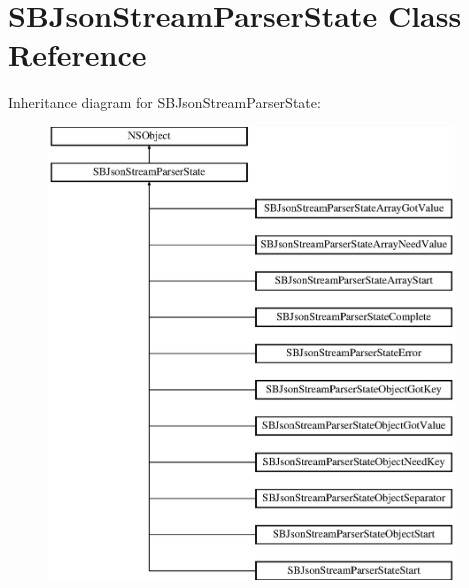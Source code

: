 \hypertarget{interface_s_b_json_stream_parser_state}{\section{S\-B\-Json\-Stream\-Parser\-State Class Reference}
\label{interface_s_b_json_stream_parser_state}
}
Inheritance diagram for S\-B\-Json\-Stream\-Parser\-State\-:\begin{figure}[H]
\begin{center}
\leavevmode
\includegraphics[height=12.000000cm]{interface_s_b_json_stream_parser_state}
\end{center}
\end{figure}

